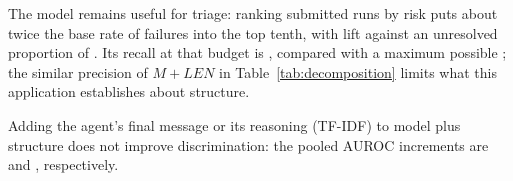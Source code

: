 The model remains useful for triage: ranking submitted runs by risk puts about twice the base rate of failures into the top tenth, with lift  against an unresolved proportion of . Its recall at that budget is , compared with a maximum possible ; the similar precision of $M+LEN$ in Table~\ref{tab:decomposition} limits what this application establishes about structure.

Adding the agent's final message or its reasoning (TF-IDF) to model plus structure does not improve discrimination: the pooled AUROC increments are  and , respectively.
